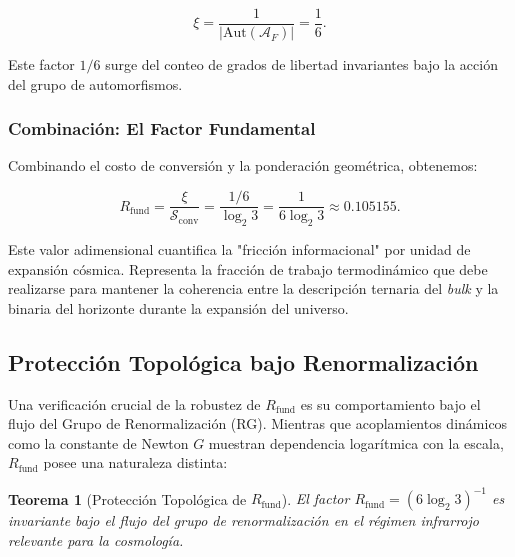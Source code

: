 \documentclass[12pt, a4paper]{article}
\theoremstyle{plain}
\newtheorem{teorema}{Teorema}
\theoremstyle{definition}
\begin{document}
\begin{equation}
\xi = \frac{1}{|\text{Aut}(\mathcal{A}_F)|} = \frac{1}{6}.
\end{equation}

Este factor $1/6$ surge del conteo de grados de libertad invariantes bajo la acción del grupo de automorfismos.

\subsubsection{Combinación: El Factor Fundamental}

Combinando el costo de conversión y la ponderación geométrica, obtenemos:

\begin{equation}
R_{\text{fund}} = \frac{\xi}{\mathcal{S}_{\text{conv}}} = \frac{1/6}{\log_2 3} = \frac{1}{6 \log_2 3} \approx 0.105155.
\label{eq:rfund_derivation}
\end{equation}

Este valor adimensional cuantifica la "fricción informacional" por unidad de expansión cósmica. Representa la fracción de trabajo termodinámico que debe realizarse para mantener la coherencia entre la descripción ternaria del \textit{bulk} y la binaria del horizonte durante la expansión del universo.

\subsection{Protección Topológica bajo Renormalización}

Una verificación crucial de la robustez de $R_{\text{fund}}$ es su comportamiento bajo el flujo del Grupo de Renormalización (RG). Mientras que acoplamientos dinámicos como la constante de Newton $G$ muestran dependencia logarítmica con la escala, $R_{\text{fund}}$ posee una naturaleza distinta:

\begin{teorema}[Protección Topológica de $R_{\text{fund}}$]
El factor $R_{\text{fund}} = (6\log_2 3)^{-1}$ es invariante bajo el flujo del grupo de renormalización en el régimen infrarrojo relevante para la cosmología.
\end{teorema}
\end{document}
